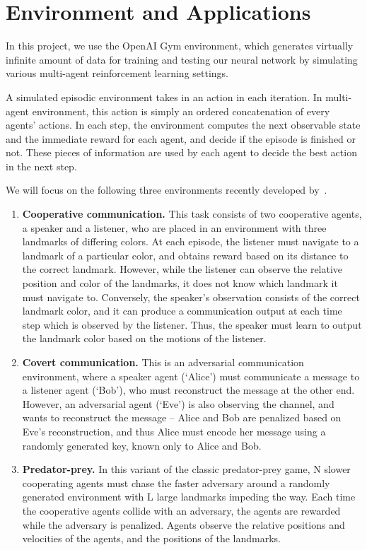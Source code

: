 
\section{Environment and Applications}
\label{sec:application}

In this project, we use the OpenAI Gym environment, which generates virtually
infinite amount of data for training and testing our neural network by
simulating various multi-agent reinforcement learning settings.

A simulated episodic environment takes in an action in each iteration. In
multi-agent environment, this action is simply an ordered concatenation of
every agents' actions. In each step, the environment computes the next
observable state and the immediate reward for each agent, and decide if the
episode is finished or not. These pieces of information are used by each agent
to decide the best action in the next step.

We will focus on the following three environments recently developed
by~\cite{lowe2017multi}.

\begin{enumerate}

\item \textbf{Cooperative communication.} This task consists of two
cooperative agents, a speaker and a listener, who are placed in an environment
with three landmarks of differing colors. At each episode, the listener must
navigate to a landmark of a particular color, and obtains reward based on its
distance to the correct landmark. However, while the listener can observe the
relative position and color of the landmarks, it does not know which landmark
it must navigate to. Conversely, the speaker’s observation consists of the
correct landmark color, and it can produce a communication output at each time
step which is observed by the listener. Thus, the speaker must learn to output
the landmark color based on the motions of the listener.

\item \textbf{Covert communication.} This is an adversarial communication
environment, where a speaker agent (‘Alice’) must communicate a message to a
listener agent (‘Bob’), who must reconstruct the message at the other end.
However, an adversarial agent (‘Eve’) is also observing the channel, and wants
to reconstruct the message -- Alice and Bob are penalized based on Eve’s
reconstruction, and thus Alice must encode her message using a randomly
generated key, known only to Alice and Bob.

\item \textbf{Predator-prey.} In this variant of the classic predator-prey
game, N slower cooperating agents must chase the faster adversary around a
randomly generated environment with L large landmarks impeding the way. Each
time the cooperative agents collide with an adversary, the agents are rewarded
while the adversary is penalized. Agents observe the relative positions and
velocities of the agents, and the positions of the landmarks.


\end{enumerate}


